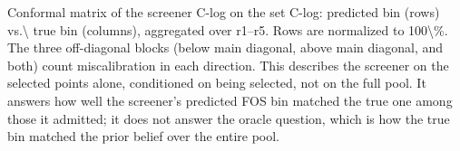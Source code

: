 Conformal matrix of the screener C-log on the set C-log: predicted bin (rows) vs.\textbackslash{} true bin (columns), aggregated over r1--r5. Rows are normalized to 100\textbackslash{}\%. The three off-diagonal blocks (below main diagonal, above main diagonal, and both) count miscalibration in each direction. This describes the screener on the selected points alone, conditioned on being selected, not on the full pool. It answers how well the screener's predicted FOS bin matched the true one among those it admitted; it does not answer the oracle question, which is how the true bin matched the prior belief over the entire pool.
